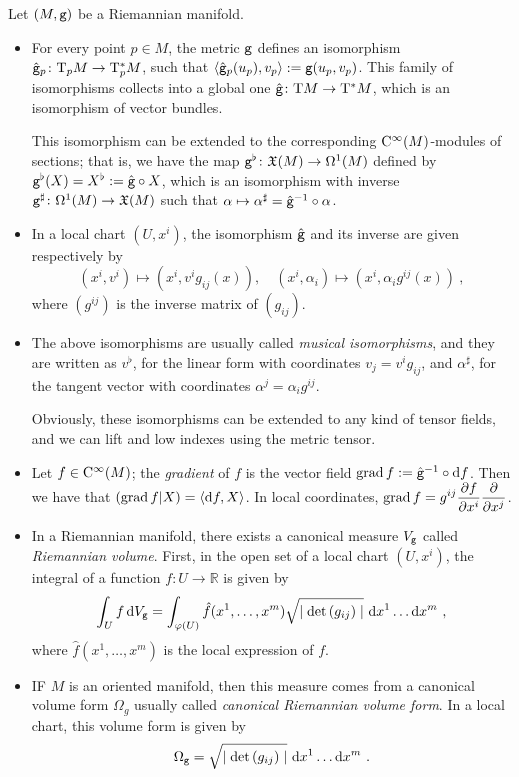 \documentclass[12pt]{report}
\def\dst{\displaystyle}
\def\vf{\mathfrak X}
\def\d{{\rm d}}
\def\Real{\mathbb{R}}
\def\Tan{{\rm T}}
\def\Cinfty{{\rm C}^\infty}
\begin{document}
Let $(M,{\tt g})$ be a Riemannian manifold.
\begin{itemize}
  \item 
For every point $p\in M$, the metric ${\tt g}$ defines an isomorphism
$\hat{\tt g}_p\colon\Tan_pM\to\Tan_p^*M$, such that
$\langle\hat{\tt g}_p(u_p),v_p\rangle:={\tt g}(u_p,v_p)$. 
This family of isomorphisms collects into a global one
$\hat{\tt g}\colon\Tan M\to\Tan^*M$, 
which is an isomorphism of vector bundles.

This isomorphism can be extended to the corresponding 
$\Cinfty(M)$-modules of sections; that is, we have the map
${\tt g}^\flat\colon\vf(M)\to\Omega^1(M)$ defined by
${\tt g}^\flat(X)=X^\flat:=\hat{\tt g}\circ X$,
which is an isomorphism with inverse 
${\tt g}^\sharp\colon\Omega^1(M)\to\vf(M)$ such that
$\alpha\mapsto\alpha^\sharp=\hat{\tt g}^{-1}\circ\alpha$. 
\item 
In a local chart $(U,x^i)$, the isomorphism $\hat{\tt g}$ 
and its inverse are given respectively by
$$ 
(x^i,v^i)\mapsto (x^i, v^ig_{ij}(x)),\quad
(x^i,\alpha_i)\mapsto(x^i, \alpha_i g^{ij}(x)) \ ,
$$ 
where $(g^{ij})$ is the inverse matrix of $(g_{ij})$.
\item
The above isomorphisms are usually called 
{\sl musical isomorphisms}, and they are written as 
$v^\flat$, for the linear form with coordinates $v_j=v^ig_{ij}$, 
and $\alpha^\sharp$, for the tangent vector with coordinates 
$\alpha^j= \alpha_i g^{ij}$. 

Obviously, these isomorphisms can be extended to any kind of tensor fields, and we can lift and low indexes using the metric tensor.
\item
Let $f\in\Cinfty(M)$; the {\sl gradient} of $f$ 
is the vector field ${\rm grad}\,f:=\hat{{\tt g}}^{-1}\circ\d f$. 
Then we have that $({\rm grad}\, f|X)=\langle\d f,X\rangle$.
In local coordinates, 
$\dst{\rm grad}\,f=g^{ij}\frac{\partial f}{\partial x^i}\frac{\partial}{\partial x^j}$.
\item 
In a Riemannian manifold, there exists a canonical measure $V_{\tt g}$ 
called {\sl Riemannian volume}. 
First, in the open set of a local chart $(U,x^i)$, 
the integral of a function $f\colon U\to \Real$ is given by
$$
\int_U f\,\d V_{\tt g}=\int_{\varphi(U)}\hat{f}(x^1,\ldots,x^m)\sqrt{{\mid\det\,(g_{ij})}\mid}\,\,\d x^1\ldots\d x^m\ ,
$$
where $\hat{f}(x^1,\ldots,x^m)$ is the local expression of $f$.
\item
IF $M$ is an oriented manifold, then this measure comes from 
a canonical volume form $\Omega_g$ usually called 
{\sl canonical Riemannian volume form}. 
In a local chart, this volume form is given by  
$$
\Omega_{\tt g}=\sqrt{{\mid\det\,(g_{ij})}\mid}\ \d x^1\ldots\d x^m \ .
$$
\end{itemize}
\end{document}
